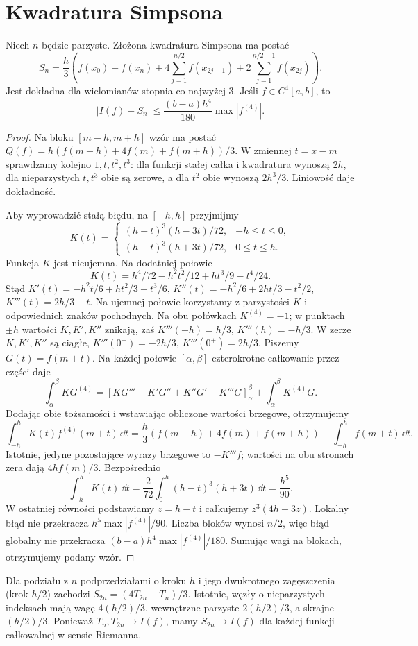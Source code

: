 \section{Kwadratura Simpsona}
\begin{twierdzenie}
\label{ma1:thm:simpson}
Niech $n$ będzie parzyste. Złożona kwadratura Simpsona ma postać
\[
 S_n=\frac h3\left(f(x_0)+f(x_n)
 +4\sum_{j=1}^{n/2} f(x_{2j-1})
 +2\sum_{j=1}^{n/2-1} f(x_{2j})\right).
\]
Jest dokładna dla wielomianów stopnia co najwyżej $3$. Jeśli $f\in C^4[a,b]$, to
\[
 |I(f)-S_n|\le\frac{(b-a)h^4}{180}\max|f^{(4)}|.
\]
\end{twierdzenie}
\begin{proof}
Na bloku $[m-h,m+h]$ wzór ma postać $Q(f)=h(f(m-h)+4f(m)+f(m+h))/3$. W zmiennej $t=x-m$ sprawdzamy kolejno $1,t,t^2,t^3$: dla funkcji stałej całka i kwadratura wynoszą $2h$, dla nieparzystych $t,t^3$ obie są zerowe, a dla $t^2$ obie wynoszą $2h^3/3$. Liniowość daje dokładność.

Aby wyprowadzić stałą błędu, na $[-h,h]$ przyjmijmy
\[
 K(t)=
 \begin{cases}
 (h+t)^3(h-3t)/72,&-h\le t\le0,\\
 (h-t)^3(h+3t)/72,&0\le t\le h.
 \end{cases}
\]
Funkcja $K$ jest nieujemna. Na dodatniej połowie
\[
 K(t)=h^4/72-h^2t^2/12+ht^3/9-t^4/24.
\]
Stąd $K'(t)=-h^2t/6+ht^2/3-t^3/6$, $K''(t)=-h^2/6+2ht/3-t^2/2$, $K'''(t)=2h/3-t$. Na ujemnej połowie korzystamy z parzystości $K$ i odpowiednich znaków pochodnych. Na obu połówkach $K^{(4)}=-1$; w punktach $\pm h$ wartości $K,K',K''$ znikają, zaś $K'''(-h)=h/3$, $K'''(h)=-h/3$. W zerze $K,K',K''$ są ciągłe, $K'''(0^- )=-2h/3$, $K'''(0^+)=2h/3$. Piszemy $G(t)=f(m+t)$. Na każdej połowie $[\alpha,\beta]$ czterokrotne całkowanie przez części daje
\[
 \int_\alpha^\beta KG^{(4)}
 =[KG'''-K'G''+K''G'-K'''G]_\alpha^\beta
 +\int_\alpha^\beta K^{(4)}G.
\]
Dodając obie tożsamości i wstawiając obliczone wartości brzegowe, otrzymujemy
\[
 \int_{-h}^h K(t)f^{(4)}(m+t)\,\dd t
 =\frac h3(f(m-h)+4f(m)+f(m+h))
 -\int_{-h}^h f(m+t)\,\dd t.
\]
Istotnie, jedyne pozostające wyrazy brzegowe to $-K'''f$; wartości na obu stronach zera dają $4hf(m)/3$. Bezpośrednio
\[
 \int_{-h}^h K(t)\,\dd t
 =\frac{2}{72}\int_0^h (h-t)^3(h+3t)\,\dd t
 =\frac{h^5}{90}.
\]
W ostatniej równości podstawiamy $z=h-t$ i całkujemy $z^3(4h-3z)$. Lokalny błąd nie przekracza $h^5\max|f^{(4)}|/90$. Liczba bloków wynosi $n/2$, więc błąd globalny nie przekracza $(b-a)h^4\max|f^{(4)}|/180$. Sumując wagi na blokach, otrzymujemy podany wzór.
\end{proof}
Dla podziału z $n$ podprzedziałami o kroku $h$ i jego dwukrotnego zagęszczenia (krok $h/2$) zachodzi $S_{2n}=(4T_{2n}-T_n)/3$. Istotnie, węzły o nieparzystych indeksach mają wagę $4(h/2)/3$, wewnętrzne parzyste $2(h/2)/3$, a skrajne $(h/2)/3$. Ponieważ $T_n,T_{2n}\to I(f)$, mamy $S_{2n}\to I(f)$ dla każdej funkcji całkowalnej w sensie Riemanna.

